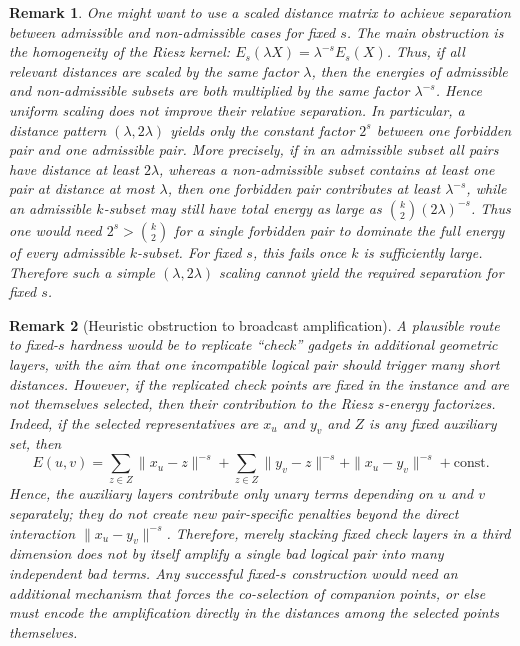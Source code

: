 \documentclass[11pt]{article}
\newtheorem{remark}{Remark}
\begin{document}
\begin{remark}
One might want to use a scaled distance matrix to achieve separation between
admissible and non-admissible cases for fixed $s$. The main obstruction is the
homogeneity of the Riesz kernel: \(E_s(\lambda X)=\lambda^{-s}E_s(X)\).
Thus, if all relevant distances are scaled by the same factor \(\lambda\),
then the energies of admissible and non-admissible subsets are both
multiplied by the same factor \(\lambda^{-s}\). Hence uniform scaling does
not improve their relative separation. In particular, a distance pattern
\((\lambda,2\lambda)\) yields only the constant factor \(2^s\) between one
forbidden pair and one admissible pair. More precisely, if in an admissible
subset all pairs have distance at least \(2\lambda\), whereas a non-admissible
subset contains at least one pair at distance at most \(\lambda\), then one
forbidden pair contributes at least \(\lambda^{-s}\), while an admissible
\(k\)-subset may still have total energy as large as
\(\binom{k}{2}(2\lambda)^{-s}\). Thus one would need
\(2^s>\binom{k}{2}\)
for a single forbidden pair to dominate the full energy of every admissible
\(k\)-subset. For fixed \(s\), this fails once \(k\) is sufficiently large.
Therefore such a simple \((\lambda,2\lambda)\) scaling cannot yield the
required separation for fixed \(s\).
\end{remark}

\begin{remark}[Heuristic obstruction to broadcast amplification]
\label{rem:broadcast-obstruction}
A plausible route to fixed-$s$ hardness would be to replicate ``check''
gadgets in additional geometric layers, with the aim that one incompatible
logical pair should trigger many short distances. However, if the replicated
check points are fixed in the instance and are not themselves selected, then
their contribution to the Riesz $s$-energy factorizes. Indeed, if the selected
representatives are $x_u$ and $y_v$ and $Z$ is any fixed auxiliary set, then
\[
E(u,v)=\sum_{z\in Z}\|x_u-z\|^{-s}
+\sum_{z\in Z}\|y_v-z\|^{-s}
+\|x_u-y_v\|^{-s}
+\mathrm{const}.
\]
Hence, the auxiliary layers contribute only unary terms depending on $u$ and
$v$ separately; they do not create new pair-specific penalties beyond the
direct interaction $\|x_u-y_v\|^{-s}$. Therefore, merely stacking fixed check
layers in a third dimension does not by itself amplify a single bad logical
pair into many independent bad terms. Any successful fixed-$s$ construction
would need an additional mechanism that forces the co-selection of companion
points, or else must encode the amplification directly in the distances among
the selected points themselves.
\end{remark}
\end{document}
